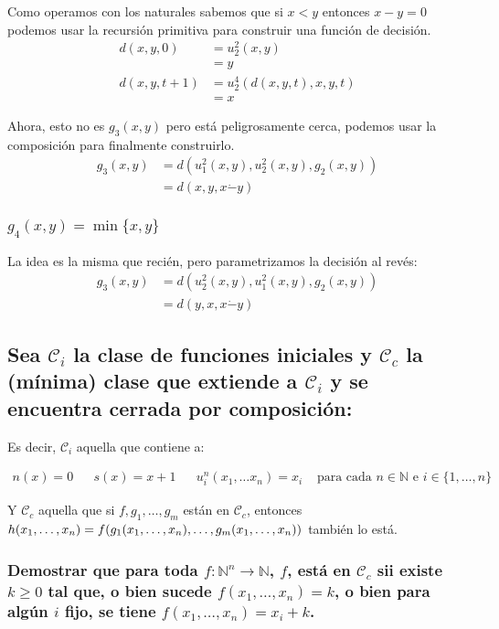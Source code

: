 \documentclass[fleqn, 11pt]{article}
\newcommand{\nat}{\mathbb{N}}
\newcommand{\Ccur}{\mathcal{C}}
\begin{document}
Como operamos con los naturales sabemos que si $x < y$ entonces $x - y = 0$
podemos usar la recursión primitiva para construir una función de decisión.
\begin{align*}
	d(x, y, 0)     &= u^2_2(x, y) \\
	&= y \\
	d(x, y, t + 1) &= u^4_2(d(x, y, t), x, y, t) \\
	&= x
\end{align*}

Ahora, esto no es $g_3(x, y)$ pero está peligrosamente cerca, podemos usar la
composición para finalmente construirlo.
\[
	\begin{split}
		g_3(x, y) &= d(u^2_1(x, y), u^2_2(x, y), g_2(x, y)) \\
		&= d(x, y, x \dot- y)
	\end{split}
\]

\subsubsection{$g_4(x, y) = \min\{x, y\}$}

La idea es la misma que recién, pero parametrizamos la decisión al revés:
\[
	\begin{split}
		g_3(x, y) &= d(u^2_2(x, y), u^2_1(x, y), g_2(x, y)) \\
		&= d(y, x, x \dot- y)
	\end{split}
\]

\subsection{Sea $\Ccur_i$ la clase de funciones iniciales y $\Ccur_c$ la
(mínima) clase que extiende a $\Ccur_i$ y se encuentra cerrada por
composición:}

Es decir, $\Ccur_i$ aquella que contiene a:

\begin{align*}
	n(x) = 0
	&&s(x) = x + 1
	&&u^n_i(x_1, \dots x_n)=x_i
	& \text{\ para cada } n \in \nat \text{\ e } i \in \{1, \dots, n\}
\end{align*}

Y $\Ccur_c$ aquella que si $f, g_1, \dots, g_m$ están en $\Ccur_c$, entonces
$h(x_1, \dots, x_n) =\\ f(g_1(x_1, \dots, x_n), \dots, g_m(x_1, \dots, x_n))$
también lo está.

\subsubsection{Demostrar que para toda $f: \nat^n \to \nat$, $f$, está en
$\Ccur_c$ sii existe $k \geq 0$ tal que, o bien sucede $f(x_1, \dots, x_n) =
k$, o bien para algún $i$ fijo, se tiene $f(x_1, \dots, x_n) = x_i + k$.}
\end{document}
